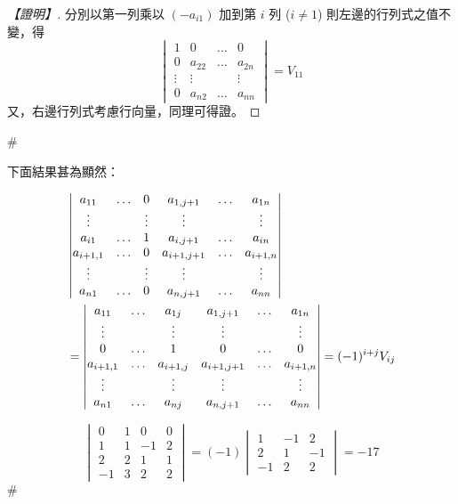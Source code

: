 \begin{proof}[【證明】]
分別以第一列乘以 $(-a_{i1})$ 加到第 $i$ 列 ($i \ne 1$) 則左邊的行列式之值不變，得
\[ \begin{vmatrix}
1 & 0 & \dots & 0 \\
0 & a_{22} & \dots & a_{2n} \\
\vdots & \vdots & & \vdots \\
0 & a_{n2} & \dots & a_{nn}
\end{vmatrix} = V_{11} \]
又，右邊行列式考慮行向量，同理可得證。
\end{proof}\hfill$\#$

下面結果甚為顯然：

\begin{corollary}\label{cor:b6-1-4}
\begin{align}
&\begin{vmatrix}
a_{11} & \dots & 0 & a_{1,j+1} & \dots & a_{1n} \\
\vdots & & \vdots & \vdots & & \vdots \\
a_{i1} & \dots & 1 & a_{i,j+1} & \dots & a_{in} \\
a_{i+1,1} & \dots & 0 & a_{i+1,j+1} & \dots & a_{i+1,n} \\
\vdots & & \vdots & \vdots & & \vdots \\
a_{n1} & \dots & 0 & a_{n,j+1} & \dots & a_{nn}
\end{vmatrix} \notag \\
&= \begin{vmatrix}
a_{11} & \dots & a_{1j} & a_{1,j+1} & \dots & a_{1n} \\
\vdots & & \vdots & \vdots & & \vdots \\
0 & \dots & 1 & 0 & \dots & 0 \\
a_{i+1,1} & \dots & a_{i+1,j} & a_{i+1,j+1} & \dots & a_{i+1,n} \\
\vdots & & \vdots & \vdots & & \vdots \\
a_{n1} & \dots & a_{nj} & a_{n,j+1} & \dots & a_{nn}
\end{vmatrix} = (-1)^{i+j} V_{ij} \label{eq:b6-1-6-14}
\end{align}
\end{corollary}

\begin{example}\label{ex:b6-1-28}
\[ \begin{vmatrix}
0 & 1 & 0 & 0 \\
1 & 1 & -1 & 2 \\
2 & 2 & 1 & 1 \\
-1 & 3 & 2 & 2
\end{vmatrix} = (-1) \begin{vmatrix}
1 & -1 & 2 \\
2 & 1 & -1 \\
-1 & 2 & 2
\end{vmatrix} = -17 \]\hfill$\#$
\end{example}

